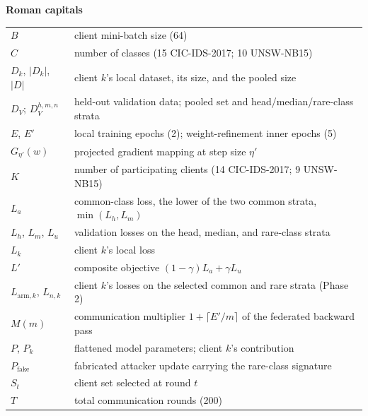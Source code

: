 \documentclass[11pt,a4paper]{report}
\newcommand{\Lprime}{L'}
\begin{document}
\noindent\textbf{Roman capitals}
\begin{center}
\begin{tabular}{@{}p{}p{}@{}}
$B$ & client mini-batch size (64)\\
$C$ & number of classes (15 CIC-IDS-2017; 10 UNSW-NB15)\\
$D_k$, $|D_k|$, $|D|$ & client $k$'s local dataset, its size, and the pooled size\\
$D_V$; $D_V^{h,m,n}$ & held-out validation data; pooled set and head/median/rare-class strata\\
$E$, $E'$ & local training epochs (2); weight-refinement inner epochs (5)\\
$G_{\eta'}(w)$ & projected gradient mapping at step size $\eta'$\\
$K$ & number of participating clients (14 CIC-IDS-2017; 9 UNSW-NB15)\\
$L_a$ & common-class loss, the lower of the two common strata, $\min(L_h,L_m)$\\
$L_h$, $L_m$, $L_u$ & validation losses on the head, median, and rare-class strata\\
$L_k$ & client $k$'s local loss\\
$\Lprime$ & composite objective $(1-\gamma)L_a+\gamma L_u$\\
$L_{\mathrm{arm},k}$, $L_{n,k}$ & client $k$'s losses on the selected common and rare strata (Phase 2)\\
$M(m)$ & communication multiplier $1+\lceil E'/m\rceil$ of the federated backward pass\\
$P$, $P_k$ & flattened model parameters; client $k$'s contribution\\
$P_{\mathrm{fake}}$ & fabricated attacker update carrying the rare-class signature\\
$S_t$ & client set selected at round $t$\\
$T$ & total communication rounds (200)\\
\end{tabular}
\end{center}
\end{document}
